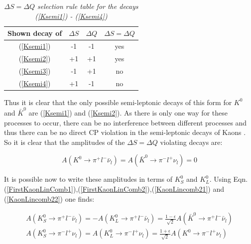 \begin{table}[h!]
\caption{\textit{$\Delta S = \Delta Q$ selection rule table for the decays (\ref{Ksemi1}) - (\ref{Ksemi4})}}
\centering
\setlength{\tabcolsep}{10pt}
\begin{tabular}{c| ccc}
\hline
Shown decay of  & $\Delta S$ & $\Delta Q$ & $\Delta S = \Delta Q$ \\ 
\hline \hline
(\ref{Ksemi1})  &     -1     &     -1     & yes                   \\
(\ref{Ksemi2})  &     +1     &     +1     & yes                   \\
(\ref{Ksemi3})  &     -1     &     +1     & no                    \\
(\ref{Ksemi4})  &     +1     &     -1     & no                    \\
\hline
\end{tabular} 
\label{DeltaSQruleKsemi}
\end{table}

\noindent Thus it is clear that the only possible semi-leptonic decays of this form for $K^{0}$ and $\bar{K}^{0}$ are (\ref{Ksemi1}) and (\ref{Ksemi2}). As there is only one way for these processes to occur, there can be no interference between different processes and thus there can be no direct CP violation in the semi-leptonic decays of Kaons \cite[pg. 10]{DAmbrosio}. So it is clear that the amplitudes of the $\Delta S = \Delta Q$ violating decays are:

\begin{equation*}
A(K^{0} \rightarrow \pi^{+} l^{-} \bar{\nu}_{l}) = A(\bar{K}^{0} \rightarrow \pi^{-} l^{+} \nu_{l}) = 0  
\end{equation*}

It is possible now to write these amplitudes in terms of $K^{0}_{S}$ and $K^{0}_{L}$. Using Eqn.(\ref{FirstKaonLinComb1}),(\ref{FirstKaonLinComb2}),(\ref{KaonLincomb21}) and (\ref{KaonLincomb22}) one finds\cite[pg. 11]{DAmbrosio}:

\begin{align*}
A({K}^{0}_{S} \rightarrow \pi^{+} l^{-} \bar{\nu}_{l}) = - A(K^{0}_{L} \rightarrow \pi^{+} l^{-} \bar{\nu}_{l}) = \frac{1 - \epsilon}{\sqrt{2}} A(\bar{K}^{0} \rightarrow \pi^{+} l^{-} \bar{\nu}_{l}) \\  
A({K}^{0}_{S} \rightarrow \pi^{-} l^{+} \nu_{l}) = A(K^{0}_{L} \rightarrow \pi^{-} l^{+} \nu_{l}) = \frac{1 + \epsilon}{\sqrt{2}} A(K^{0} \rightarrow \pi^{-} l^{+} \nu_{l})   
\end{align*}

